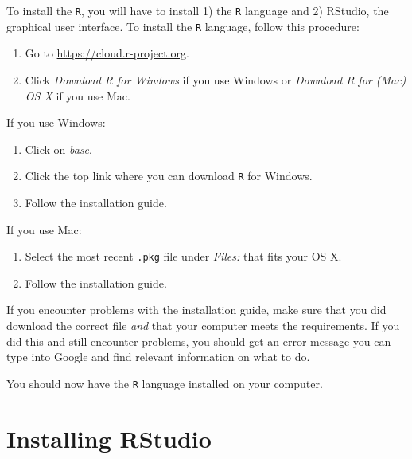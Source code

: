 \documentclass[12pt,oneside]{reedthesis}
\providecommand{\tightlist}{%
  \setlength{\itemsep}{0pt}\setlength{\parskip}{0pt}}
\theoremstyle{definition}
\theoremstyle{definition}
\theoremstyle{definition}
\theoremstyle{remark}
\begin{document}
  To install the \texttt{R}, you will have to install 1) the \texttt{R}
  language and 2) RStudio, the graphical user interface. To install the
  \texttt{R} language, follow this procedure:
  \begin{enumerate}
  \def\labelenumi{\arabic{enumi}.}
  \tightlist
  \item
    Go to \url{https://cloud.r-project.org}.
  \item
    Click \emph{Download R for Windows} if you use Windows or
    \emph{Download R for (Mac) OS X} if you use Mac.
  \end{enumerate}
  If you use Windows:
  \begin{enumerate}
  \def\labelenumi{\arabic{enumi}.}
  \setcounter{enumi}{2}
  \tightlist
  \item
    Click on \emph{base}.
  \item
    Click the top link where you can download \texttt{R} for Windows.
  \item
    Follow the installation guide.
  \end{enumerate}
  If you use Mac:
  \begin{enumerate}
  \def\labelenumi{\arabic{enumi}.}
  \setcounter{enumi}{2}
  \tightlist
  \item
    Select the most recent \texttt{.pkg} file under \emph{Files:} that
    fits your OS X.
  \item
    Follow the installation guide.
  \end{enumerate}
  If you encounter problems with the installation guide, make sure that
  you did download the correct file \emph{and} that your computer meets
  the requirements. If you did this and still encounter problems, you
  should get an error message you can type into Google and find relevant
  information on what to do.
  
  You should now have the \texttt{R} language installed on your computer.
  
  \section{Installing RStudio}\label{installing-rstudio}
  
\end{document}
